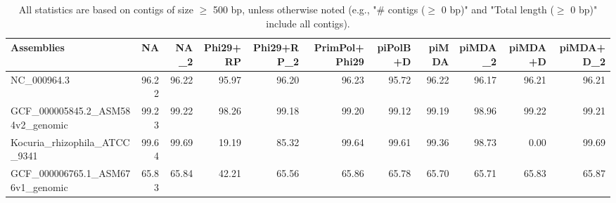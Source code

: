 \documentclass[12pt,a4paper]{article}
\begin{document}
\begin{table}[ht]
\begin{center}
\caption{All statistics are based on contigs of size $\geq$ 500 bp, unless otherwise noted (e.g., "\# contigs ($\geq$ 0 bp)" and "Total length ($\geq$ 0 bp)" include all contigs).}
\begin{tabular}{|l*{10}{|r}|}
\hline
Assemblies & NA & NA\_2 & Phi29+RP & Phi29+RP\_2 & PrimPol+Phi29 & piPolB+D & piMDA & piMDA\_2 & piMDA+D & piMDA+D\_2 \\ \hline
NC\_000964.3 & 96.22 & 96.22 & 95.97 & 96.20 & 96.23 & 95.72 & 96.22 & 96.17 & 96.21 & 96.21 \\ \hline
GCF\_000005845.2\_ASM584v2\_genomic & 99.23 & 99.22 & 98.26 & 99.18 & 99.20 & 99.12 & 99.19 & 98.96 & 99.22 & 99.21 \\ \hline
Kocuria\_rhizophila\_ATCC\_9341 & 99.64 & 99.69 & 19.19 & 85.32 & 99.64 & 99.61 & 99.36 & 98.73 & 0.00 & 99.69 \\ \hline
GCF\_000006765.1\_ASM676v1\_genomic & 65.83 & 65.84 & 42.21 & 65.56 & 65.86 & 65.78 & 65.70 & 65.71 & 65.83 & 65.87 \\ \hline
\end{tabular}
\end{center}
\end{table}
\end{document}
